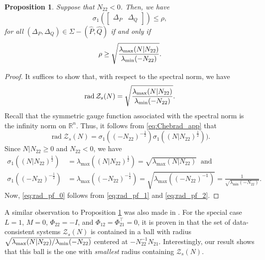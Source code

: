 \documentclass[pdflatex,sn-mathphys-num]{sn-jnl}%
\DeclareMathOperator{\rad}{rad}
\theoremstyle{thmstyleone}
\newtheorem{proposition}[theorem]{Proposition}
\begin{document}
\begin{proposition}
\label{prop:spec_norm_rad}
Suppose that $N_{22}<0$. Then, we have
\begin{equation}
\label{eq:cor:sv-1}
\sigma_{1}\left(\begin{bmatrix}
\Delta_P & \Delta_Q
\end{bmatrix}\right)\leq \rho,
\end{equation}
for all $(\Delta_P,\Delta_Q)\in\Sigma-(\hat{P},\hat{Q})$ if and only if
\begin{equation}
\label{eq:cor:sv-2}
\rho \geq\sqrt{\frac{\lambda_{\textup{max}}(N|N_{22})}{\lambda_{\textup{min}}(-N_{22})}}.
\end{equation}
\end{proposition}
\begin{proof}
It suffices to show that, with respect to the spectral norm, we have
\begin{equation}
\label{eq:rad_pf_0}
\rad\mathcal{Z}_s(N)=\sqrt{\frac{\lambda_{\textup{max}}(N|N_{22})}{\lambda_{\textup{min}}(-N_{22})}}. 
\end{equation}
Recall that the symmetric gauge function associated with the spectral norm is the infinity norm on $\mathbb{R}^n$. Thus, it follows from \eqref{eq:Chebrad_app} that
\begin{equation}
\label{eq:rad_pf_1}
\rad\mathcal{Z}_s(N)=\sigma_{1}((-N_{22})^{-\frac{1}{2}}) \sigma_1((N|N_{22})^{\frac{1}{2}})).
\end{equation}
Since $N|N_{22}\geq 0$ and $N_{22}<0$, we have
\begin{equation}
\label{eq:rad_pf_2}
\begin{split}
\sigma_1((N|N_{22})^{\frac{1}{2}})&=\lambda_\text{max}((N|N_{22})^{\frac{1}{2}})=\sqrt{\lambda_\text{max}(N|N_{22})}\ \text{ and}\\ 
\sigma_{1}((-N_{22})^{-\frac{1}{2}})&=\lambda_\text{max}((-N_{22})^{-\frac{1}{2}})=\sqrt{\lambda_\text{max}((-N_{22})^{-1})}=\frac{1}{\sqrt{\lambda_\text{min}(-N_{22})}}.
\end{split}
\end{equation}
Now, \eqref{eq:rad_pf_0} follows from \eqref{eq:rad_pf_1} and \eqref{eq:rad_pf_2}. 
\end{proof}

A similar observation to Proposition \ref{prop:spec_norm_rad} was also made in \cite{eising2023data}. For the special case $L=1$, $M=0$, $\Phi_{22}=-I$, and $\Phi_{12}=\Phi_{21}^\top=0$, it is proven in \mbox{\cite[Lem. IV.5]{eising2023data}} that the set of data-consistent systems $\mathcal{Z}_s(N)$ is contained in a ball with radius $\sqrt{\lambda_{\textup{max}}(N | N_{22}) / \lambda_{\textup{min}}(-N_{22})}$ centered at $-N_{22}^{-1}N_{21}$. Interestingly, our result shows that this ball is the one with \emph{smallest} radius containing $\mathcal{Z}_s(N)$.
\end{document}
